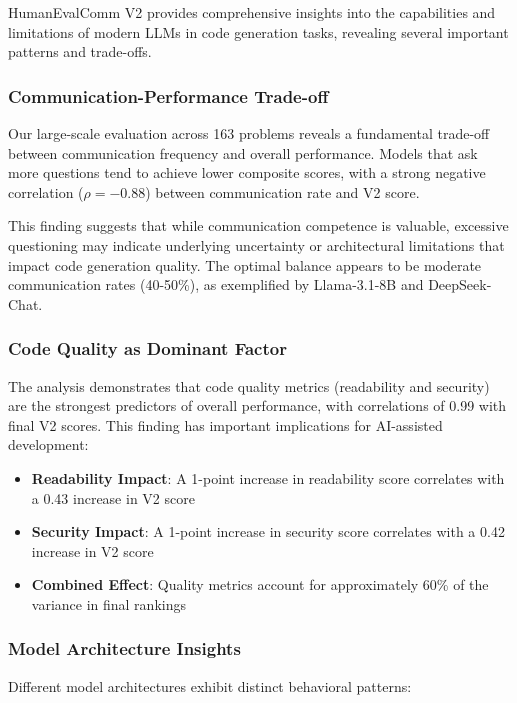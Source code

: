 \documentclass[conference]{IEEEtran}
\begin{document}
HumanEvalComm V2 provides comprehensive insights into the capabilities and limitations of modern LLMs in code generation tasks, revealing several important patterns and trade-offs.

\subsubsection{Communication-Performance Trade-off}

Our large-scale evaluation across 163 problems reveals a fundamental trade-off between communication frequency and overall performance. Models that ask more questions tend to achieve lower composite scores, with a strong negative correlation ($\rho = -0.88$) between communication rate and V2 score.

This finding suggests that while communication competence is valuable, excessive questioning may indicate underlying uncertainty or architectural limitations that impact code generation quality. The optimal balance appears to be moderate communication rates (40-50\%), as exemplified by Llama-3.1-8B and DeepSeek-Chat.

\subsubsection{Code Quality as Dominant Factor}

The analysis demonstrates that code quality metrics (readability and security) are the strongest predictors of overall performance, with correlations of 0.99 with final V2 scores. This finding has important implications for AI-assisted development:

\begin{itemize}
    \item \textbf{Readability Impact}: A 1-point increase in readability score correlates with a 0.43 increase in V2 score
    \item \textbf{Security Impact}: A 1-point increase in security score correlates with a 0.42 increase in V2 score
    \item \textbf{Combined Effect}: Quality metrics account for approximately 60\% of the variance in final rankings
\end{itemize}

\subsubsection{Model Architecture Insights}

Different model architectures exhibit distinct behavioral patterns:
\end{document}
